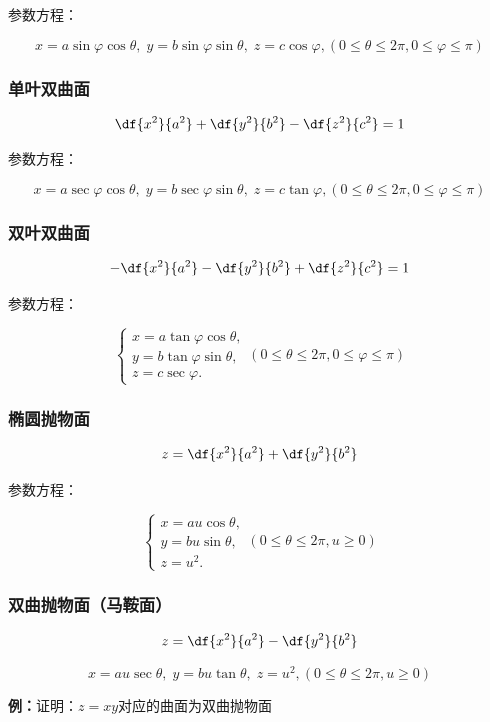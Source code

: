 参数方程：

$${x=a\sin\varphi\cos\theta,\;y=b\sin\varphi\sin\theta,\;z=c\cos\varphi},
{(0\leq\theta\leq
2\pi,0\leq\varphi\leq\pi)}$$

\subsubsection{单叶双曲面}

$${\df{x^2}{a^2}+\df{y^2}{b^2}-\df{z^2}{c^2}=1}$$

参数方程：

$$x=a\sec\varphi\cos\theta,\;y=b\sec\varphi\sin\theta,\;z=c\tan\varphi,
(0\leq\theta\leq 2\pi,0\leq\varphi\leq\pi)$$

\subsubsection{双叶双曲面}

$${-\df{x^2}{a^2}-\df{y^2}{b^2}+\df{z^2}{c^2}=1}$$

参数方程：

$$\left\{\begin{array}{l}
	x=a\tan\varphi\cos\theta,\\
	y=b\tan\varphi\sin\theta,\\
	z=c\sec\varphi.
\end{array}\right.(0\leq\theta\leq 2\pi,0\leq\varphi\leq\pi)$$

\subsubsection{椭圆抛物面}

$${z=\df{x^2}{a^2}+\df{y^2}{b^2}}$$

参数方程：

$$\left\{\begin{array}{l}
	x=au\cos\theta,\\
	y=bu\sin\theta,\\
	z=u^2.
\end{array}\right.(0\leq\theta\leq 2\pi,u\geq 0)$$

\subsubsection{双曲抛物面（马鞍面）}

$${z=\df{x^2}{a^2}-\df{y^2}{b^2}}$$

$$x=au\sec\theta,\;y=bu\tan\theta,\;z=u^2,
(0\leq\theta\leq 2\pi,u\geq
0)$$

{\bf 例：}证明：$z=xy$对应的曲面为双曲抛物面

